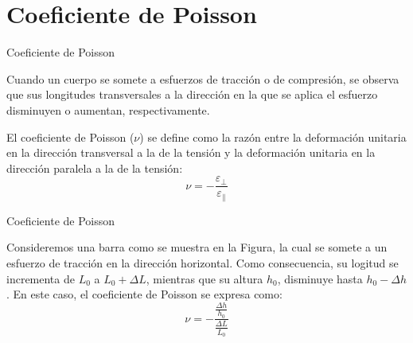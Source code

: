 \documentclass[11pt,handout,aspectratio=1610]{beamer}
\newcommand{\vs}{\vspace{11pt}}
\begin{document}
\section{Coeficiente de Poisson}

\begin{frame}{Coeficiente de Poisson}

    Cuando un cuerpo se somete a esfuerzos de tracción o de compresión, se observa que sus longitudes transversales a la dirección en la que se aplica el esfuerzo disminuyen o aumentan, respectivamente.

    \vs

    El coeficiente de Poisson ($\nu$) se define como la razón entre la deformación unitaria en la dirección transversal a la de la tensión y la deformación unitaria en la dirección paralela a la de la tensión: $$ \nu = - \frac{\varepsilon_\perp}{\varepsilon_\parallel} $$

\end{frame}

\begin{frame}{Coeficiente de Poisson}

    Consideremos una barra como se muestra en la Figura, la cual se somete a un esfuerzo de tracción en la dirección horizontal. Como consecuencia, su logitud se incrementa de $L_0$ a $L_0 + \Delta L$, mientras que su altura $h_0$, disminuye hasta $h_0 - \Delta h$. En este caso, el coeficiente de Poisson se expresa como: $$ \nu = - \frac{\frac{\Delta h}{h_0}}{\frac{\Delta L}{L_0}} $$

    \begin{figure}
        \centering
    \end{figure}

\end{frame}
\end{document}
